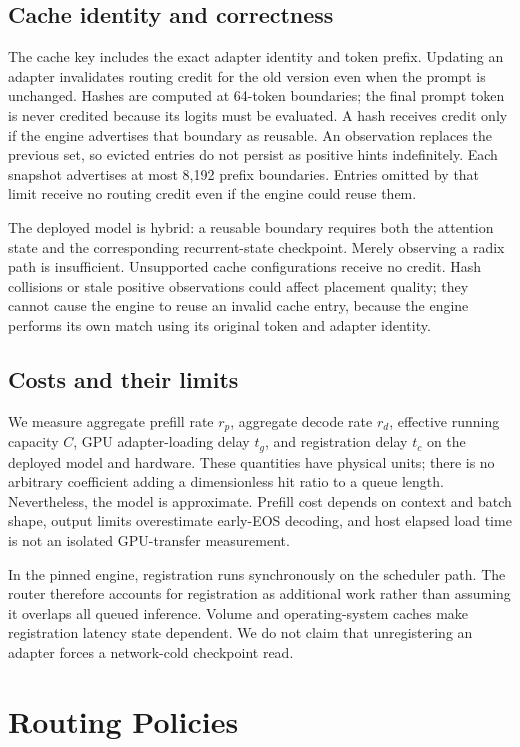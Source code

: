 \documentclass[10pt,twocolumn,letterpaper]{article}
\begin{document}
\subsection{Cache identity and correctness}
The cache key includes the exact adapter identity and token prefix. Updating an
adapter invalidates routing credit for the old version even when the prompt is
unchanged. Hashes are computed at 64-token boundaries; the final prompt token is
never credited because its logits must be evaluated. A hash receives credit only
if the engine advertises that boundary as reusable. An observation replaces the
previous set, so evicted entries do not persist as positive hints indefinitely.
Each snapshot advertises at most 8,192 prefix boundaries. Entries omitted by
that limit receive no routing credit even if the engine could reuse them.

The deployed model is hybrid: a reusable boundary requires both the attention
state and the corresponding recurrent-state checkpoint. Merely observing a radix
path is insufficient. Unsupported cache configurations receive no credit. Hash
collisions or stale positive observations could affect placement quality; they
cannot cause the engine to reuse an invalid cache entry, because the engine
performs its own match using its original token and adapter identity.

\subsection{Costs and their limits}
We measure aggregate prefill rate $r_p$, aggregate decode rate $r_d$, effective
running capacity $C$, GPU adapter-loading delay $t_g$, and registration delay
$t_c$ on the deployed model and hardware. These quantities have physical units;
there is no arbitrary coefficient adding a dimensionless hit ratio to a queue
length. Nevertheless, the model is approximate. Prefill cost depends on context
and batch shape, output limits overestimate early-EOS decoding, and host elapsed
load time is not an isolated GPU-transfer measurement.

In the pinned engine, registration runs synchronously on the scheduler path.
The router therefore accounts for registration as additional work rather than
assuming it overlaps all queued inference. Volume and operating-system caches
make registration latency state dependent. We do not claim that unregistering an
adapter forces a network-cold checkpoint read.

\section{Routing Policies}
\end{document}
